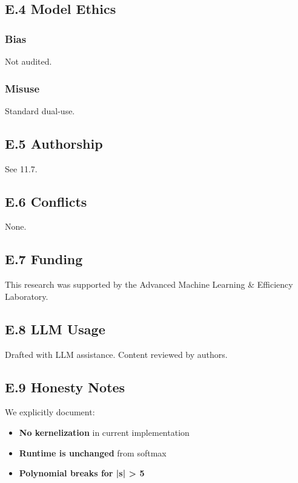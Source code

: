 \subsection{E.4 Model Ethics}

\subsubsection{Bias}
Not audited.

\subsubsection{Misuse}
Standard dual-use.

\subsection{E.5 Authorship}

See  11.7.

\subsection{E.6 Conflicts}

None.

\subsection{E.7 Funding}

This research was supported by the Advanced Machine Learning \& Efficiency Laboratory.

\subsection{E.8 LLM Usage}

Drafted with LLM assistance. Content reviewed by authors.

\subsection{E.9 Honesty Notes}

We explicitly document:
\begin{itemize}
\item \textbf{No kernelization} in current implementation
\item \textbf{Runtime is unchanged} from softmax
\item \textbf{Polynomial breaks for |s| \textgreater{} 5}

\end{itemize}
